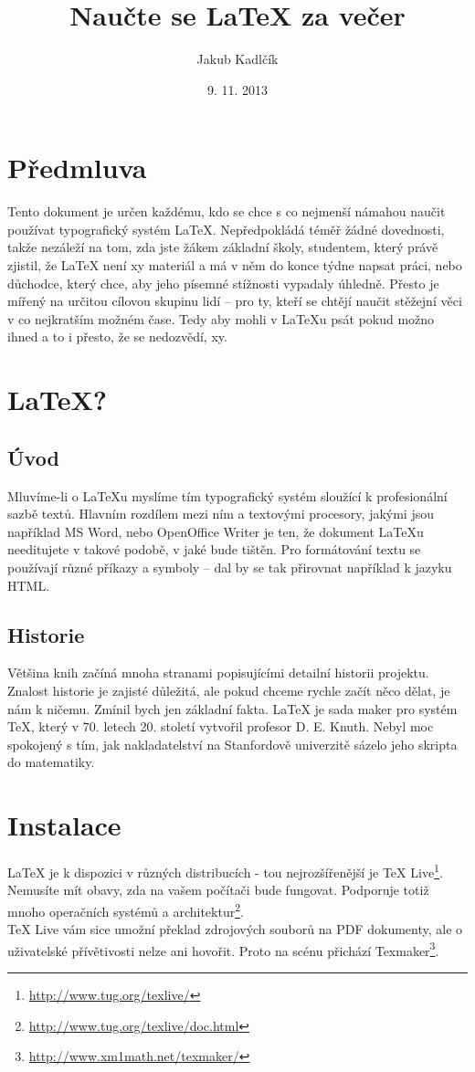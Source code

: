 \documentclass[10pt,a4paper]{article}
\title{Naučte se LaTeX za večer}
\author{Jakub Kadlčík}
\date{9. 11. 2013}
\begin{document}
	
	\maketitle
	\newpage

	\section*{Předmluva}
	Tento dokument je určen každému, kdo se chce s co nejmenší námahou naučit používat typografický systém LaTeX. Nepředpokládá téměř žádné dovednosti, takže nezáleží na tom, zda jste žákem základní školy, studentem, který právě zjistil, že LaTeX není xy materiál a má v něm do konce týdne napsat práci, nebo důchodce, který chce, aby jeho písemné stížnosti vypadaly úhledně.
	Přesto je mířený na určitou cílovou skupinu lidí -- pro ty, kteří se chtějí naučit stěžejní věci v co nejkratším možném čase. Tedy aby mohli v LaTeXu psát pokud možno ihned a to i přesto, že se nedozvědí, xy.
		
	\newpage
	\tableofcontents
	\newpage
	
    \section{LaTeX?}
		\subsection{Úvod}
		Mluvíme-li o LaTeXu myslíme tím typografický systém sloužící k profesionální sazbě textů. Hlavním rozdílem mezi ním a textovými procesory, jakými jsou například MS Word, nebo OpenOffice Writer je ten, že dokument LaTeXu needitujete v takové podobě, v jaké bude tištěn. Pro formátování textu se používají různé příkazy a symboly -- dal by se tak přirovnat například k jazyku HTML.
		
		\subsection{Historie}
		Většina knih začíná mnoha stranami popisujícími detailní historii projektu. Znalost historie je zajisté důležitá, ale pokud chceme rychle začít něco dělat, je nám k ničemu. Zmínil bych jen základní fakta. LaTeX je sada maker pro systém TeX, který v 70. letech 20. století vytvořil profesor D. E. Knuth. Nebyl moc spokojený s tím, jak nakladatelství na  Stanfordově univerzitě sázelo jeho skripta do matematiky. 

	\newpage
	\section{Instalace}
		LaTeX je k dispozici v různých distribucích - tou nejrozšířenější je TeX Live\footnote{\url{http://www.tug.org/texlive/}}. Nemusíte mít obavy, zda na vašem počítači bude fungovat. Podporuje totiž mnoho operačních systémů a architektur\footnote{\url{http://www.tug.org/texlive/doc.html}}.
		\\
		TeX Live vám sice umožní překlad zdrojových souborů na PDF dokumenty, ale o uživatelské přívětivosti nelze ani hovořit. Proto na scénu přichází Texmaker\footnote{\url{http://www.xm1math.net/texmaker/}}. 
\end{document}
